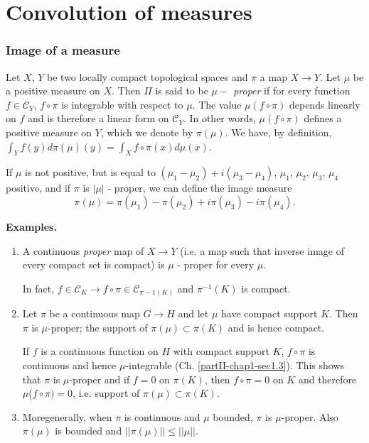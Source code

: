 
\chapter{Convolution of measures}\label{partII-chap2}

\setcounter{section}{2}
\setcounter{subsection}{0}
\subsection{Image of a
  measure}\label{partII-chap2-sec2.1}\pageoriginale%

\begin{defi*}%
Let $X$, $Y$ be two locally compact topological spaces and $\pi$ a map
$X \rightarrow Y$. Let $\mu$ be a positive  measure on $X$. Then $\Pi
$ is said to be {\em $\mu-$ proper} if for every function $f \in
\mathscr{C}_Y$, $f\circ \pi$ is integrable with respect to $\mu$. The
value $\mu (f \circ \pi)$ depends linearly on $f$ and is therefore a
linear form on $\mathscr{C}_Y$. In other words, $\mu (f\circ \pi)$
defines a positive measure on $Y$, which we denote by $\pi(\mu)$. We
have, by definition, $\int_Y f(y) d  \pi (\mu)(y) = \int_X f \circ \pi (x)
d \mu (x)$. 
\end{defi*}

If $\mu$ is not positive, but is equal to $(\mu_1 - \mu_2) + i(\mu_3
- \mu_4)$, $\mu_1$, $\mu_2$, $\mu_3$, $\mu_4$ positive, and if $\pi$
is $|\mu|$ - proper, we can define the image measure 
$$ 
\pi (\mu)= \pi (\mu_1) - \pi(\mu_2) + i \pi (\mu_3) - i\pi(\mu_4).
$$

\noindent
\textbf{Examples.}
\begin{enumerate}
\renewcommand{\labelenumi}{(\theenumi)}
\item A continuous {\em proper} map of $X \rightarrow Y$ (i.e. a map
  such that inverse image of every compact set is compact) is $\mu$ -
  proper for every $\mu$. 

In fact, $f \in \mathscr{C}_{K} \rightarrow f \circ \pi \in
\mathscr{C}_{\pi-1(K)}$ and $\pi^{-1}(K)$ is compact. 

\item Let $\pi$ be a continuous map $G \rightarrow H$ and let $\mu$
  have compact support $K$. Then $\pi$ is $\mu$-proper; the support of
  $\pi (\mu) \subset \pi (K)$ and is hence compact. 

If $f$ is a continuous function on $H$ with compact support $K$, $f\circ
\pi$ is continuous and hence $\mu$-integrable (Ch. \ref{partII-chap1-sec1.3}). This
shows that $\pi$ is $\mu$-proper and if $f=0$ on $\pi (K)$, then $f
\circ \pi = 0$ on $K$ and therefore $\mu$($f\circ \pi) = 0$,
i.e. support of $\pi(\mu)\subset \pi (K)$. 

\item More\pageoriginale generally, when $\pi$ is continuous and $\mu$
  bounded, 
   $\pi$ is $\mu$-proper. Also $\pi(\mu)$ is bounded and $|| \pi (\mu)
  || \leq || \mu ||$. 
\end{enumerate}

